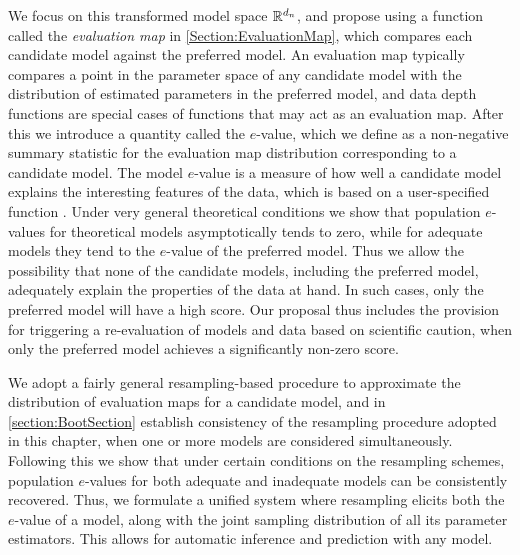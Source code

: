 We focus on this transformed model space ${\mathbb{R}}^{d_{n}}$, and propose using a function called the {\textit{evaluation map}} in \ref{Section:EvaluationMap}, which compares each candidate model against the preferred model. An evaluation map typically compares a point in the parameter space of any candidate model with the distribution of estimated parameters in the preferred model, and data depth functions are special cases of functions that may act as an evaluation map. After this we introduce a quantity called the $e$-value, which we define as a non-negative summary statistic for the evaluation map distribution corresponding to a candidate model. The model $e$-value is a measure of how well a candidate model explains the interesting features of the data, which is based on a user-specified function%
. Under very general theoretical conditions we show that population $e$-values for theoretical models asymptotically tends to zero, while for adequate models they tend to the $e$-value of the preferred model. Thus we allow the possibility that none of the candidate models, including the preferred model, adequately explain the properties of the data at hand. In such cases, only the preferred model will have a high score. Our proposal thus includes the provision for triggering a re-evaluation of models and data based on scientific caution, when only the preferred model achieves a significantly non-zero score.

We adopt a fairly general resampling-based procedure to approximate the distribution of evaluation maps for a candidate model, and in \ref{section:BootSection} establish consistency of the resampling procedure adopted in this chapter, when one or more models are considered simultaneously. Following this we show that under certain conditions on the resampling schemes, population $e$-values for both adequate and inadequate models can be consistently recovered. 
Thus, we formulate a unified system where resampling elicits both the $e$-value of a model, along with the joint sampling distribution of all its parameter estimators. This allows for automatic inference and prediction with any model.

